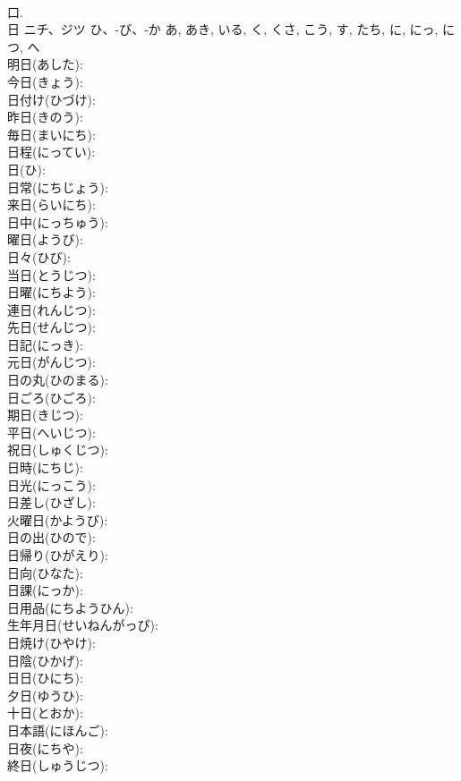 \documentclass[8pt]{extreport}
\begin{document}
\begin{CJK}{UTF8}{min}
\\	口.
\\	日	ニチ、ジツ	ひ、-び、-か	あ, あき, いる, く, くさ, こう, す, たち, に, にっ, につ, へ	
\\	明日(あした): 
\\	今日(きょう): 
\\	日付け(ひづけ): 
\\	昨日(きのう): 
\\	毎日(まいにち): 
\\	日程(にってい): 
\\	日(ひ): 
\\	日常(にちじょう): 
\\	来日(らいにち): 
\\	日中(にっちゅう): 
\\	曜日(ようび): 
\\	日々(ひび): 
\\	当日(とうじつ): 
\\	日曜(にちよう): 
\\	連日(れんじつ): 
\\	先日(せんじつ): 
\\	日記(にっき): 
\\	元日(がんじつ): 
\\	日の丸(ひのまる): 
\\	日ごろ(ひごろ): 
\\	期日(きじつ): 
\\	平日(へいじつ): 
\\	祝日(しゅくじつ): 
\\	日時(にちじ): 
\\	日光(にっこう): 
\\	日差し(ひざし): 
\\	火曜日(かようび): 
\\	日の出(ひので): 
\\	日帰り(ひがえり): 
\\	日向(ひなた): 
\\	日課(にっか): 
\\	日用品(にちようひん): 
\\	生年月日(せいねんがっぴ): 
\\	日焼け(ひやけ): 
\\	日陰(ひかげ): 
\\	日日(ひにち): 
\\	夕日(ゆうひ): 
\\	十日(とおか): 
\\	日本語(にほんご): 
\\	日夜(にちや): 
\\	終日(しゅうじつ): 

\end{CJK}
\end{document}
